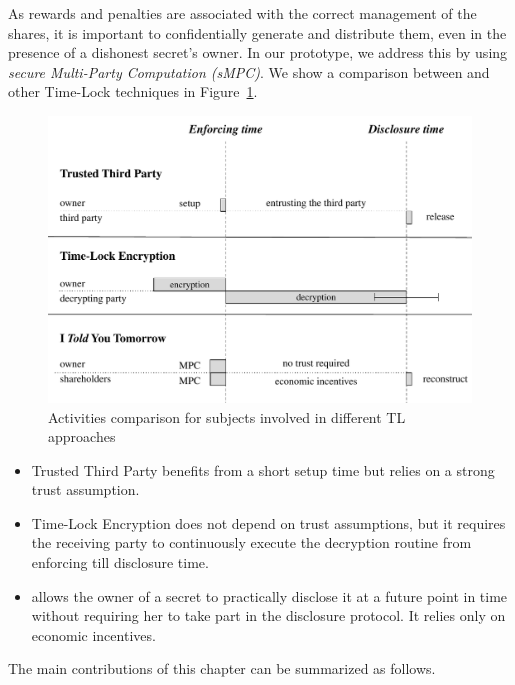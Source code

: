 As rewards and penalties are associated with the correct management of the shares, it is important to confidentially generate and distribute them, even in the presence of a dishonest secret's owner.
In our prototype, we address this by using {\em secure Multi-Party Computation (sMPC)}.
%
We show a comparison between \shortname  and other Time-Lock techniques in Figure~\ref{fig:models}.

\begin{figure}[t]
	\centering
	\includegraphics[width=1.0\textwidth]{fig/models}
	\caption{Activities comparison for subjects involved in different TL approaches}
	\label{fig:models}
\end{figure}


\begin{itemize}
	\item Trusted Third Party benefits from a short setup time but relies on a strong trust assumption.
	
	\item Time-Lock Encryption does not depend on trust assumptions, but it requires the receiving party to continuously execute the decryption routine from enforcing till disclosure time.
	
	\item {\em \name} allows the owner of a secret to practically disclose it at a future point in time without requiring her to take part in the disclosure protocol. It relies only on economic incentives.
\end{itemize}

\noindent The main contributions of this chapter can be summarized as follows.


